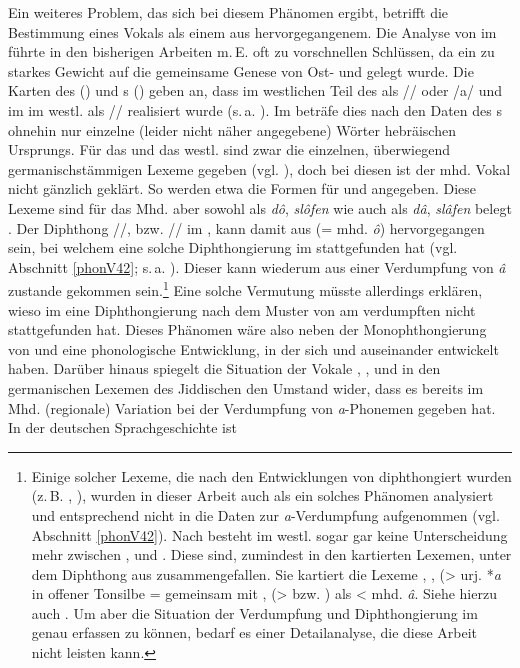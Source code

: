 Ein weiteres Problem, das sich bei diesem Phänomen ergibt, betrifft die Bestimmung eines Vokals als einem aus  hervorgegangenem. Die Analyse von  im  führte in den bisherigen Arbeiten m.\,E. oft zu vorschnellen Schlüssen, da ein zu starkes Gewicht auf die gemeinsame Genese von Ost- und  gelegt wurde. Die Karten des  (\citeyear[67]{Herzog1992}) und \citeauthor{GuggenheimGruenberg1973}s (\citeyear[60–64]{GuggenheimGruenberg1973}) geben an, dass  im westlichen Teil des  als /\textopeno {}/ oder /a/ und im  im westl.  als /\textopeno \textsubarch{\textsci}/ realisiert wurde (s.\,a. \cite{Beider2010}). Im  beträfe dies nach den Daten des s ohnehin nur einzelne (leider nicht näher angegebene) Wörter hebräischen Ursprungs. Für das  und das westl.  sind zwar die einzelnen, überwiegend germanischstämmigen Lexeme gegeben (vgl. \cite{GuggenheimGruenberg1973}), doch bei diesen ist der mhd. Vokal nicht gänzlich geklärt. So werden etwa die Formen für    und    angegeben. Diese Lexeme sind für das Mhd. aber sowohl als \textit{dô}, \textit{slôfen} wie auch als \textit{dâ}, \textit{slâfen} belegt \parencite[Bd. 1, Sp. 445]{Lexer1992}. Der Diphthong /\textopeno {}/, bzw. /\textopeno \textsubarch{\textsci}/ im , kann damit aus  (= mhd. \textit{ô}) hervorgegangen sein, bei welchem eine solche Diphthongierung im  stattgefunden hat (vgl. Abschnitt \ref{phonV42}; s.\,a. \cite[188]{Bin-Nun1973}). Dieser kann wiederum aus einer Verdumpfung von \textit{â} zustande gekommen sein.\footnote{Einige solcher Lexeme, die nach den Entwicklungen von  diphthongiert wurden (z.\,B. , ), wurden in dieser Arbeit auch als ein solches Phänomen analysiert und entsprechend nicht in die Daten zur \textit{a}-Verdumpfung aufgenommen (vgl. Abschnitt \ref{phonV42}). Nach \textcite[60f]{GuggenheimGruenberg1973} besteht im westl.  sogar gar keine Unterscheidung mehr zwischen ,  und . Diese sind, zumindest in den kartierten Lexemen, unter dem Diphthong aus  zusammengefallen. Sie kartiert die Lexeme , ,  (> urj. *\textit{a} in offener Tonsilbe =  gemeinsam mit ,  (>  bzw. ) als < mhd. \textit{â}. Siehe hierzu auch \textcite[115]{Timm1987}. Um aber die Situation der Verdumpfung und Diphthongierung im  genau erfassen zu können, bedarf es einer Detailanalyse, die diese Arbeit nicht leisten kann.} Eine solche Vermutung müsste allerdings erklären, wieso im  eine Diphthongierung nach dem Muster von  am verdumpften  nicht stattgefunden hat. Dieses Phänomen wäre also neben der Monophthongierung von  und  eine phonologische Entwicklung, in der sich  und  auseinander entwickelt haben. Darüber hinaus spiegelt die Situation der Vokale , ,  und  in den germanischen Lexemen des Jiddischen den Umstand wider, dass es bereits im Mhd. (regionale) Variation bei der Verdumpfung von \textit{a}-Phonemen gegeben hat. In der deutschen Sprachgeschichte ist 